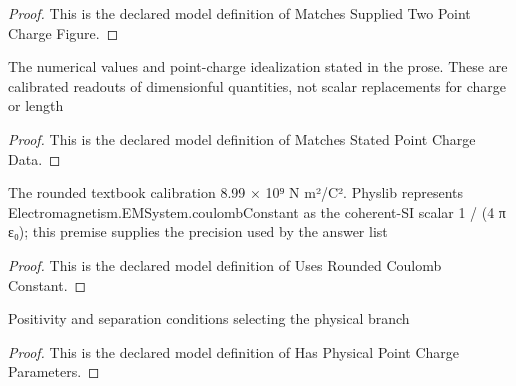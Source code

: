 \begin{proof}
  This is the declared model definition of Matches Supplied Two Point Charge Figure.
\end{proof}
\begin{definition}
  \label{def:physics:phyx-mini-0992:phyxminiproblems-problemphyxmini0992-matchesstatedpointchargedata}
  The numerical values and point-charge idealization stated in the prose. These are calibrated readouts of dimensionful quantities, not scalar replacements for charge or length
\end{definition}
\begin{proof}
  This is the declared model definition of Matches Stated Point Charge Data.
\end{proof}
\begin{definition}
  \label{def:physics:phyx-mini-0992:phyxminiproblems-problemphyxmini0992-usesroundedcoulombconstant}
  The rounded textbook calibration 8.99 × 10⁹ N m²/C². Physlib represents Electromagnetism.EMSystem.coulombConstant as the coherent-SI scalar 1 / (4 π ε₀); this premise supplies the precision used by the answer list
\end{definition}
\begin{proof}
  This is the declared model definition of Uses Rounded Coulomb Constant.
\end{proof}
\begin{definition}
  \label{def:physics:phyx-mini-0992:phyxminiproblems-problemphyxmini0992-hasphysicalpointchargeparameters}
  Positivity and separation conditions selecting the physical branch
\end{definition}
\begin{proof}
  This is the declared model definition of Has Physical Point Charge Parameters.
\end{proof}
